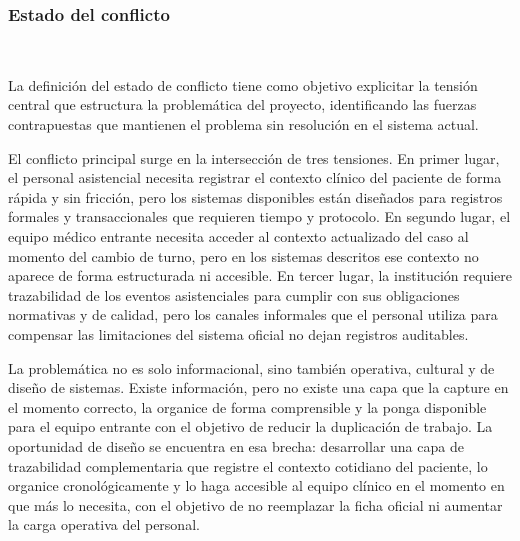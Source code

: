 \subsubsection*{Estado del conflicto} ~

La definición del estado de conflicto tiene como objetivo explicitar la tensión central que estructura la problemática del proyecto, identificando las fuerzas contrapuestas que mantienen el problema sin resolución en el sistema actual.

El conflicto principal surge en la intersección de tres tensiones. En primer lugar, el personal asistencial necesita registrar el contexto clínico del paciente de forma rápida y sin fricción, pero los sistemas disponibles están diseñados para registros formales y transaccionales que requieren tiempo y protocolo. En segundo lugar, el equipo médico entrante necesita acceder al contexto actualizado del caso al momento del cambio de turno, pero en los sistemas descritos ese contexto no aparece de forma estructurada ni accesible. En tercer lugar, la institución requiere trazabilidad de los eventos asistenciales para cumplir con sus obligaciones normativas y de calidad, pero los canales informales que el personal utiliza para compensar las limitaciones del sistema oficial no dejan registros auditables.

La problemática no es solo informacional, sino también operativa, cultural y de diseño de sistemas. Existe información, pero no existe una capa que la capture en el momento correcto, la organice de forma comprensible y la ponga disponible para el equipo entrante con el objetivo de reducir la duplicación de trabajo. La oportunidad de diseño se encuentra en esa brecha: desarrollar una capa de trazabilidad complementaria que registre el contexto cotidiano del paciente, lo organice cronológicamente y lo haga accesible al equipo clínico en el momento en que más lo necesita, con el objetivo de no reemplazar la ficha oficial ni aumentar la carga operativa del personal.
